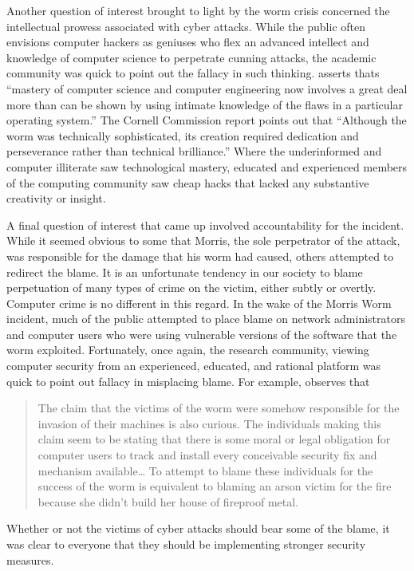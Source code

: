 Another question of interest brought to light by the worm crisis concerned the
intellectual prowess associated with cyber attacks. While the public often
envisions computer hackers as geniuses who flex an advanced intellect and
knowledge of computer science to perpetrate cunning attacks, the
academic community was quick to point out the fallacy in such thinking.
\cite{spafford_crisis_1989} asserts thats ``mastery of computer science and
computer engineering now involves a great deal more than can be shown by using
intimate knowledge of the flaws in a particular operating system.'' The Cornell
Commission report points out that ``Although the worm was technically
sophisticated, its creation required dedication and perseverance rather than
technical brilliance.'' Where the underinformed and computer
illiterate saw technological mastery, educated and experienced members of the
computing community saw cheap hacks that lacked any substantive creativity or
insight.

A final question of interest that came up involved accountability for the
incident. While it seemed obvious to some that Morris, the sole perpetrator of
the attack, was responsible for the damage that his worm had caused, others
attempted to redirect the blame. It is an unfortunate tendency in our society to
blame perpetuation of many types of crime on the victim, either subtly or
overtly. Computer crime is no different in this regard. In the wake of the
Morris Worm incident, much of the public attempted to place blame on network
administrators and computer users who were using vulnerable versions of the
software that the worm exploited. Fortunately, once again, the research
community, viewing computer security from an experienced, educated, and
rational platform was quick to point out fallacy in misplacing blame.
For example, \cite{spafford_crisis_1989} observes that
\begin{quote}
The claim that the victims of the worm were somehow responsible for the
invasion of their machines is also curious. The individuals making this claim
seem to be stating that there is some moral or legal obligation for computer
users to track and install every conceivable security fix and mechanism
available\ldots
To attempt to blame these individuals for the success of the worm is equivalent
to blaming an arson victim for the fire because she didn't build her house of
fireproof metal.
\end{quote}
Whether or not the victims of cyber attacks should bear some of the blame, it
was clear to everyone that they should be implementing stronger security
measures.

